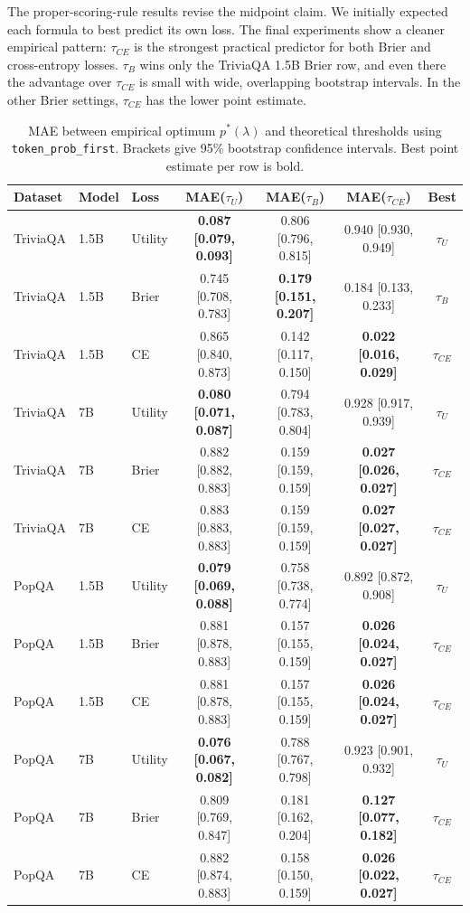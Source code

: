 \documentclass[letterpaper,10pt,twocolumn]{article}
\begin{document}
The proper-scoring-rule results revise the midpoint claim. We initially
expected each formula to best predict its own loss. The final experiments show
a cleaner empirical pattern: $\tau_{CE}$ is the strongest practical predictor
for both Brier and cross-entropy losses. $\tau_B$ wins only the TriviaQA 1.5B
Brier row, and even there the advantage over $\tau_{CE}$ is small with wide,
overlapping bootstrap intervals. In the other Brier settings,
$\tau_{CE}$ has the lower point estimate.

\begin{table}[t]
\centering
\caption{MAE between empirical optimum $p^\ast(\lambda)$ and theoretical
thresholds using \texttt{token\_prob\_first}. Brackets give 95\% bootstrap
confidence intervals. Best point estimate per row is bold.}
\label{tab:mae_first}
\scriptsize
\renewcommand{\arraystretch}{1.18}
\begin{tabular}{lllcccc}
\toprule
Dataset & Model & Loss & MAE($\tau_U$) & MAE($\tau_B$) &
MAE($\tau_{CE}$) & Best \\
\midrule
TriviaQA & 1.5B & Utility & \textbf{0.087 [0.079, 0.093]} & 0.806 [0.796, 0.815] & 0.940 [0.930, 0.949] & $\tau_U$ \\
TriviaQA & 1.5B & Brier & 0.745 [0.708, 0.783] & \textbf{0.179 [0.151, 0.207]} & 0.184 [0.133, 0.233] & $\tau_B$ \\
TriviaQA & 1.5B & CE & 0.865 [0.840, 0.873] & 0.142 [0.117, 0.150] & \textbf{0.022 [0.016, 0.029]} & $\tau_{CE}$ \\
\midrule
TriviaQA & 7B & Utility & \textbf{0.080 [0.071, 0.087]} & 0.794 [0.783, 0.804] & 0.928 [0.917, 0.939] & $\tau_U$ \\
TriviaQA & 7B & Brier & 0.882 [0.882, 0.883] & 0.159 [0.159, 0.159] & \textbf{0.027 [0.026, 0.027]} & $\tau_{CE}$ \\
TriviaQA & 7B & CE & 0.883 [0.883, 0.883] & 0.159 [0.159, 0.159] & \textbf{0.027 [0.027, 0.027]} & $\tau_{CE}$ \\
\midrule
PopQA & 1.5B & Utility & \textbf{0.079 [0.069, 0.088]} & 0.758 [0.738, 0.774] & 0.892 [0.872, 0.908] & $\tau_U$ \\
PopQA & 1.5B & Brier & 0.881 [0.878, 0.883] & 0.157 [0.155, 0.159] & \textbf{0.026 [0.024, 0.027]} & $\tau_{CE}$ \\
PopQA & 1.5B & CE & 0.881 [0.878, 0.883] & 0.157 [0.155, 0.159] & \textbf{0.026 [0.024, 0.027]} & $\tau_{CE}$ \\
\midrule
PopQA & 7B & Utility & \textbf{0.076 [0.067, 0.082]} & 0.788 [0.767, 0.798] & 0.923 [0.901, 0.932] & $\tau_U$ \\
PopQA & 7B & Brier & 0.809 [0.769, 0.847] & 0.181 [0.162, 0.204] & \textbf{0.127 [0.077, 0.182]} & $\tau_{CE}$ \\
PopQA & 7B & CE & 0.882 [0.874, 0.883] & 0.158 [0.150, 0.159] & \textbf{0.026 [0.022, 0.027]} & $\tau_{CE}$ \\
\bottomrule
\end{tabular}
\end{table}
\end{document}
